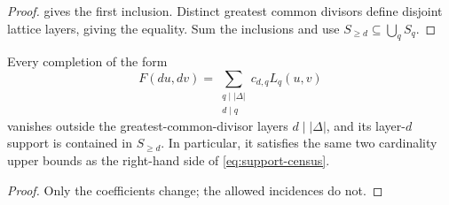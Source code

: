 \begin{proof}
 gives the first inclusion.  Distinct greatest
common divisors define disjoint lattice layers, giving the equality.
Sum the inclusions and use
\(S_{\ge d}\subseteq\bigcup_qS_q\).
\end{proof}

\begin{corollary}
\label{cor:filter-divisor-carrier}
Every completion of the form
\[
 F(du,dv)
 =
 \sum_{\substack{q\mid|\Delta|\\d\mid q}}c_{d,q}L_q(u,v)
\]
vanishes outside the greatest-common-divisor layers
\(d\mid|\Delta|\), and its layer-\(d\) support is contained in
\(S_{\ge d}\).  In particular, it satisfies the same two cardinality
upper bounds as the right-hand side of \eqref{eq:support-census}.
\end{corollary}

\begin{proof}
Only the coefficients change; the allowed incidences do not.
\end{proof}
